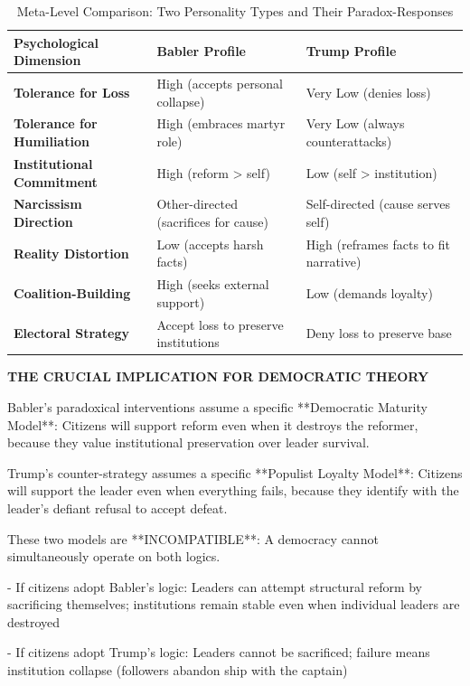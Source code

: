 \begin{table}[h]
\centering
\caption{Meta-Level Comparison: Two Personality Types and Their Paradox-Responses}
\label{tab:dx-personality-paradox}
\begin{tabular}{|l|l|l|}
\hline
\textbf{Psychological Dimension} & \textbf{Babler Profile} & \textbf{Trump Profile} \\
\hline
\textbf{Tolerance for Loss} & High (accepts personal collapse) & Very Low (denies loss) \\
\hline
\textbf{Tolerance for Humiliation} & High (embraces martyr role) & Very Low (always counterattacks) \\
\hline
\textbf{Institutional Commitment} & High (reform > self) & Low (self > institution) \\
\hline
\textbf{Narcissism Direction} & Other-directed (sacrifices for cause) & Self-directed (cause serves self) \\
\hline
\textbf{Reality Distortion} & Low (accepts harsh facts) & High (reframes facts to fit narrative) \\
\hline
\textbf{Coalition-Building} & High (seeks external support) & Low (demands loyalty) \\
\hline
\textbf{Electoral Strategy} & Accept loss to preserve institutions & Deny loss to preserve base \\
\hline
\end{tabular}
\end{table}

\vspace{0.5cm}

\textbf{THE CRUCIAL IMPLICATION FOR DEMOCRATIC THEORY}

Babler's paradoxical interventions assume a specific **Democratic Maturity Model**: Citizens will support reform
even when it destroys the reformer, because they value institutional preservation over leader survival.

Trump's counter-strategy assumes a specific **Populist Loyalty Model**: Citizens will support the leader even when
everything fails, because they identify with the leader's defiant refusal to accept defeat.

These two models are **INCOMPATIBLE**: A democracy cannot simultaneously operate on both logics.

- If citizens adopt Babler's logic: Leaders can attempt structural reform by sacrificing themselves; institutions
  remain stable even when individual leaders are destroyed

- If citizens adopt Trump's logic: Leaders cannot be sacrificed; failure means institution collapse (followers
  abandon ship with the captain)

